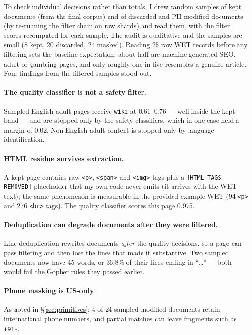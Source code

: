 \documentclass{article}
\begin{document}
To check individual decisions rather than totals, I drew random samples of kept documents
(from the final corpus) and of discarded and PII-modified documents (by re-running the filter
chain on raw shards) and read them, with the filter scores recomputed for each sample. The
audit is qualitative and the samples are small (8 kept, 20 discarded, 24 masked). Reading 25
raw WET records before any filtering sets the baseline expectation: about half are
machine-generated SEO, adult or gambling pages, and only roughly one in five resembles a
genuine article. Four findings from the filtered samples stood out.

\paragraph{The quality classifier is not a safety filter.}
Sampled English adult pages receive \texttt{wiki} at 0.61--0.76 --- well inside the kept band
--- and are stopped only by the safety classifiers, which in one case held a margin of 0.02.
Non-English adult content is stopped only by language identification.

\paragraph{HTML residue survives extraction.}
A kept page contains raw \texttt{<p>}, \texttt{<span>} and \texttt{<img>} tags plus a
\texttt{[HTML TAGS REMOVED]} placeholder that my own code never emits (it arrives with the WET
text); the same phenomenon is measurable in the provided example WET (94 \texttt{<p>} and 276
\texttt{<br>} tags). The quality classifier scores this page 0.975.

\paragraph{Deduplication can degrade documents after they were filtered.}
Line deduplication rewrites documents \emph{after} the quality decisions, so a page can pass
filtering and then lose the lines that made it substantive. Two sampled documents now have
45 words, or 36.8\% of their lines ending in ``\ldots'' --- both would fail the Gopher rules
they passed earlier.

\paragraph{Phone masking is US-only.}
As noted in §\ref{sec:primitives}: 4 of 24 sampled modified documents retain international
phone numbers, and partial matches can leave fragments such as \texttt{+91-}.
\end{document}
